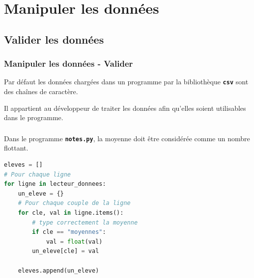 \documentclass[svgnames,11pt]{beamer}
\begin{document}
\section{Manipuler les données}
\subsection{Valider les données}
\begin{frame}
    \frametitle{Manipuler les données - Valider}
    \begin{aretenir}[]
        Par défaut les données chargées dans un programme par la bibliothèque \textbf{\texttt{csv}} sont des chaînes de caractère.
    \end{aretenir}
    \begin{aretenir}[Remarque]
    Il appartient au développeur de traiter les données afin qu'elles soient utilisables dans le programme.
    \end{aretenir}
\end{frame}
\begin{frame}[fragile]
    \frametitle{}
Dans le programme \textbf{\texttt{notes.py}}, la moyenne doit être considérée comme un nombre flottant.
    \begin{center}
        \begin{lstlisting}[language=Python, xleftmargin=1em,xrightmargin=1em,basicstyle=\ttfamily\small]
eleves = []
# Pour chaque ligne
for ligne in lecteur_donnees:
    un_eleve = {}
    # Pour chaque couple de la ligne
    for cle, val in ligne.items():
        # type correctement la moyenne
        if cle == "moyennes":
            val = float(val)
        un_eleve[cle] = val
    
    eleves.append(un_eleve)
\end{lstlisting}
        \label{CODE}
    \end{center} 

\end{frame}
\end{document}
